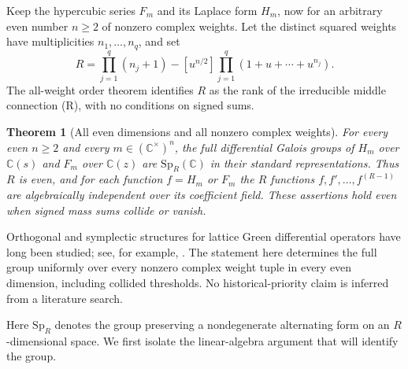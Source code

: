 \documentclass[11pt,a4paper]{article}
\newtheorem{theorem}{Theorem}[section]
\theoremstyle{definition}
\theoremstyle{remark}
\numberwithin{equation}{section}
\begin{document}
Keep the hypercubic series $F_m$ and its Laplace form $H_m$,
now for an arbitrary even number $n\ge2$ of nonzero complex weights.
Let the distinct squared weights have multiplicities $n_1,\ldots,n_q$,
and set
\[
 R=\prod_{j=1}^q(n_j+1)
       -[u^{n/2}]\prod_{j=1}^q(1+u+\cdots+u^{n_j}).
\]
The all-weight order theorem identifies $R$ as the rank of the
irreducible middle connection (R), with no conditions on signed sums.

\begin{theorem}[All even dimensions and all nonzero complex weights]
\label{p6:fe:main}
For every even $n\ge2$ and every $m\in(\mathbb C^\times)^n$, the
full differential Galois groups of $H_m$ over $\mathbb C(s)$ and
$F_m$ over $\mathbb C(z)$ are $\mathrm{Sp}_R(\mathbb C)$ in their
standard representations. Thus $R$ is even, and for each function
$f=H_m$ or $F_m$ the $R$ functions $f,f',\ldots,f^{(R-1)}$ are
algebraically independent over its coefficient field. These assertions hold even when signed mass
sums collide or vanish.
\end{theorem}

Orthogonal and symplectic structures for lattice Green differential
operators have long been studied; see, for example,
\cite{p6:FS_BHMW2014}. The statement here determines the full group
uniformly over every nonzero complex weight tuple in every even
dimension, including collided thresholds. No historical-priority
claim is inferred from a literature search.

Here $\mathrm{Sp}_R$ denotes the group preserving a nondegenerate
alternating form on an $R$-dimensional space. We first isolate the
linear-algebra argument that will identify the group.
\end{document}

